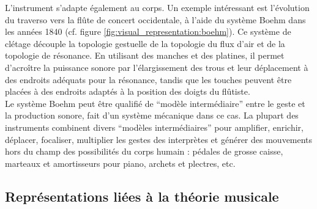 
\noindent L'instrument s'adapte également au corps. Un exemple intéressant est l'évolution du traverso vers la flûte de concert occidentale, à l'aide du système Boehm dans les années 1840 (cf. figure \ref{fig:visual_representation:boehm}). Ce système de clétage découple la topologie gestuelle de la topologie du flux d'air et de la topologie de résonance. En utilisant des manches et des platines, il permet d'acroître la puissance sonore par l'élargissement des trous et leur déplacement à des endroits adéquats pour la résonance, tandis que les touches peuvent être placées à des endroits adaptés à la position des doigts du flûtiste.\\
\indent Le système Boehm peut être qualifié de ``modèle intermédiaire'' entre le geste et la production sonore, fait d'un système mécanique dans ce cas. La plupart des instruments combinent divers ``modèles intermédiaires'' pour amplifier, enrichir, déplacer, focaliser, multiplier les gestes des interprètes et générer des mouvements hors du champ des possibilités du corps humain : pédales de grosse caisse, marteaux et amortisseurs pour piano, archets et plectres, etc.

\subsection{Représentations liées à la théorie musicale}
\label{ch:visual_representation:music-theory}

